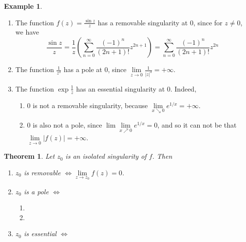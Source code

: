 \documentclass[12pt,openany]{book}
\newtheorem{theorem}{Theorem}[chapter]
\theoremstyle{definition}
\newtheorem{example}{Example}[section]
\newcommand{\of}[1]{\left( #1 \right)}
\newcommand{\abs}[1]{\left\lvert #1 \right\rvert}
\begin{document}
	\begin{example}
		\ \begin{enumerate}[(1)]
			\item The function $f(z)=\displaystyle\frac{\sin z}{z}$ has a removable singularity at $0$, since for $z\neq 0$, we have \[
			\frac{\sin z}{z}=\frac{1}{z}\of{\sum_{n=0}^\infty\frac{(-1)^n}{(2n+1)!}z^{2n+1}}=\sum_{n=0}^\infty\frac{(-1)^n}{(2n+1)!}z^{2n}
			\]
			\item The function $\displaystyle\frac{1}{z^3}$ has a pole at $0$, since $\displaystyle\lim\limits_{z\to 0}\frac{1}{\abs{z}^3}=+\infty$.
			\item The function $\exp\displaystyle\frac{1}{z}$ has an essential singularity at $0$. Indeed, \begin{enumerate}
				\item $0$ is not a removable singularity, because $\lim\limits_{x\searrow 0}e^{1/x}=+\infty$.
				\item $0$ is also not a pole, since $\lim\lim\limits_{x\nearrow 0}e^{1/x}=0$, and so it can not be that $\lim\limits_{z\to 0}\abs{f(z)}=+\infty$.
			\end{enumerate}
		\end{enumerate}
	\end{example}
	\vspace{8pt}
	\begin{tcolorbox}[colback=white,colframe=thmcolor,arc=5pt,title={\color{white}\bf Classification of Singularities via Limits}]
		\begin{theorem}
			Let $z_0$ is an isolated singularity of $f$. Then \begin{enumerate}[(1)]
				\item $z_0$ is removable $\iff\lim\limits_{z\to z_0}f(z)=0$.
				\item $z_0$ is a pole $\iff$ \begin{enumerate}
					\item 
					\item 
				\end{enumerate}
				\item $z_0$ is essential $\iff$
			\end{enumerate}
		\end{theorem}
	\end{tcolorbox}
	
	\begin{tcolorbox}[colback=white,colframe=defcolor,arc=5pt,title={\color{white}\bf }]
		
	\end{tcolorbox}	
	\begin{tcolorbox}[colback=white,colframe=defcolor,arc=5pt,title={\color{white}\bf }]
		
	\end{tcolorbox}	
	\begin{tcolorbox}[colback=white,colframe=defcolor,arc=5pt,title={\color{white}\bf }]
		
	\end{tcolorbox}
	
	
		
	
\end{document}
